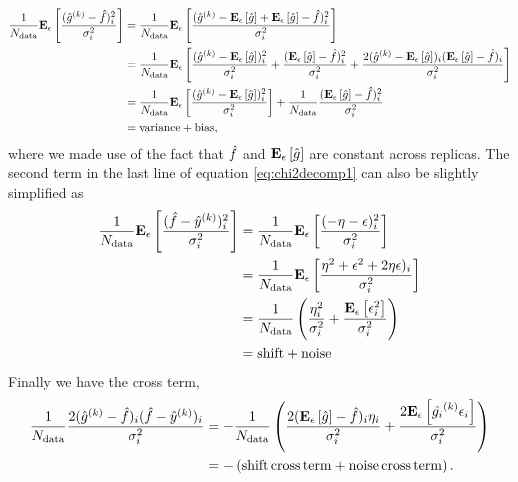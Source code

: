 \begin{equation}
    \begin{split}
        \frac{1}{N_{\rm data}}\mathbf{E}_{\epsilon}\left[ \frac{(\hat{g}^{(k)} - \hat{f})^2_i}{\sigma^{2}_i} \right] &=
        \frac{1}{N_{\rm data}}\mathbf{E}_{\epsilon}\left[ \frac{(\hat{g}^{(k)} - \mathbf{E}_{\epsilon}\left[ \hat{g} \right] + \mathbf{E}_{\epsilon}\left[ \hat{g} \right] - \hat{f})^2_i}{\sigma^{2}_i} \right] \\
        &= \frac{1}{N_{\rm data}}\mathbf{E}_{\epsilon}\left[ \frac{(\hat{g}^{(k)} - \mathbf{E}_{\epsilon}\left[ \hat{g} \right])_i^2}{\sigma^{2}_i} +
        \frac{(\mathbf{E}_{\epsilon}\left[ \hat{g} \right] - \hat{f})^2_i}{\sigma^{2}_i} +
        \frac{2(\hat{g}^{(k)} - \mathbf{E}_{\epsilon}\left[ \hat{g} \right])_i(\mathbf{E}_{\epsilon}\left[ \hat{g} \right] - \hat{f})_i}{\sigma^{2}_i} \right] \\
        &= \frac{1}{N_{\rm data}}\mathbf{E}_{\epsilon}\left[ \frac{(\hat{g}^{(k)} - \mathbf{E}_{\epsilon}\left[ \hat{g} \right])_i^2}{\sigma^{2}_i} \right] +
        \frac{1}{N_{\rm data}}\frac{(\mathbf{E}_{\epsilon}\left[ \hat{g} \right] - \hat{f})^2_i}{\sigma^{2}_i} \\
        &= {\rm variance} + {\rm bias},
    \end{split}
\end{equation}
where we made use of the fact that $\hat{f}$ and $\mathbf{E}_{\epsilon}\left[ \hat{g} \right]$
are constant across replicas. The second term in the last line of equation
\eqref{eq:chi2decomp1} can also be slightly simplified as
\begin{equation}
    \begin{split}
        \frac{1}{N_{\rm data}}\mathbf{E}_{\epsilon}\left[ \frac{(\hat{f} - \hat{y}^{(k)})_i^2}{\sigma^{2}_i} \right] &=
        \frac{1}{N_{\rm data}}\mathbf{E}_{\epsilon}\left[ \frac{(-\eta - \epsilon)_i^2}{\sigma^{2}_i} \right] \\
        &= \frac{1}{N_{\rm data}}\mathbf{E}_{\epsilon}\left[ \frac{\eta^2 + \epsilon^2 + 2\eta\epsilon)_i}{\sigma^{2}_i} \right] \\
        &= \frac{1}{N_{\rm data}} \left(\frac{\eta_i^2}{\sigma^{2}_i} + \frac{\mathbf{E}_{\epsilon}\left[ \epsilon_i^2 \right]}{\sigma^{2}_i} \right) \\
        &= {\rm shift} + {\rm noise}
    \end{split}
\end{equation}
Finally we have the cross term,
\begin{equation}
    \begin{split}
        \frac{1}{N_{\rm data}}\frac{2(\hat{g}^{(k)} - \hat{f})_i(\hat{f} - \hat{y}^{(k)})_i}{\sigma^{2}_i} &=
             - \frac{1}{N_{\rm data}} \left( \frac{2(\mathbf{E}_{\epsilon}\left[ \hat{g} \right] - \hat{f})_i\eta_i}{\sigma^{2}_i} +
             \frac{2\mathbf{E}_{\epsilon}\left[ \hat{g_i}^{(k)} \epsilon_i \right]}{\sigma^{2}_i} \right) \\
         &= - \left( {\rm shift \, cross \, term} + {\rm noise \, cross \, term} \right).
    \end{split}
\end{equation}
